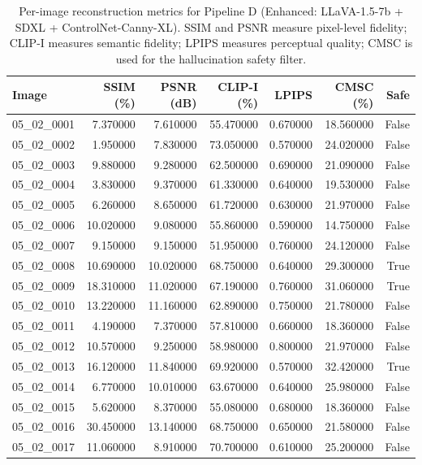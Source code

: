 \begin{table}
\caption{Per-image reconstruction metrics for Pipeline D (Enhanced: LLaVA-1.5-7b + SDXL + ControlNet-Canny-XL). SSIM and PSNR measure pixel-level fidelity; CLIP-I measures semantic fidelity; LPIPS measures perceptual quality; CMSC is used for the hallucination safety filter.}
\label{tab:per_image_metrics}
\begin{tabular}{lrrrrrr}
\toprule
Image & SSIM (\%) & PSNR (dB) & CLIP-I (\%) & LPIPS & CMSC (\%) & Safe \\
\midrule
05\_02\_0001 & 7.370000 & 7.610000 & 55.470000 & 0.670000 & 18.560000 & False \\
05\_02\_0002 & 1.950000 & 7.830000 & 73.050000 & 0.570000 & 24.020000 & False \\
05\_02\_0003 & 9.880000 & 9.280000 & 62.500000 & 0.690000 & 21.090000 & False \\
05\_02\_0004 & 3.830000 & 9.370000 & 61.330000 & 0.640000 & 19.530000 & False \\
05\_02\_0005 & 6.260000 & 8.650000 & 61.720000 & 0.630000 & 21.970000 & False \\
05\_02\_0006 & 10.020000 & 9.080000 & 55.860000 & 0.590000 & 14.750000 & False \\
05\_02\_0007 & 9.150000 & 9.150000 & 51.950000 & 0.760000 & 24.120000 & False \\
05\_02\_0008 & 10.690000 & 10.020000 & 68.750000 & 0.640000 & 29.300000 & True \\
05\_02\_0009 & 18.310000 & 11.020000 & 67.190000 & 0.760000 & 31.060000 & True \\
05\_02\_0010 & 13.220000 & 11.160000 & 62.890000 & 0.750000 & 21.780000 & False \\
05\_02\_0011 & 4.190000 & 7.370000 & 57.810000 & 0.660000 & 18.360000 & False \\
05\_02\_0012 & 10.570000 & 9.250000 & 58.980000 & 0.800000 & 21.970000 & False \\
05\_02\_0013 & 16.120000 & 11.840000 & 69.920000 & 0.570000 & 32.420000 & True \\
05\_02\_0014 & 6.770000 & 10.010000 & 63.670000 & 0.640000 & 25.980000 & False \\
05\_02\_0015 & 5.620000 & 8.370000 & 55.080000 & 0.680000 & 18.360000 & False \\
05\_02\_0016 & 30.450000 & 13.140000 & 68.750000 & 0.650000 & 21.580000 & False \\
05\_02\_0017 & 11.060000 & 8.910000 & 70.700000 & 0.610000 & 25.200000 & False \\

\end{tabular}
\end{table}
